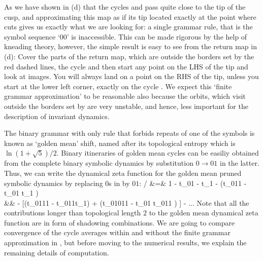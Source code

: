 As we have shown in  (d) that the cycles 
and  pass quite close to the tip of the cusp, and approximating this
map as if its tip located exactly at the point where  cuts gives us
exactly what we are looking for: a single grammar rule, that is the symbol
sequence `00' is inaccessible. This can be made rigorous by the help of
kneading theory, however, the simple result is easy to see from the return map
in  (d): Cover the parts of the return map, which
are outside the borders set by the red dashed lines, the cycle  and
then start any point on the LHS of the tip and look at images. You will always
land on a point on the RHS of the tip, unless you start at the lower left
corner, exactly on the cycle . We expect this `finite grammar
approximation' to be reasonable also because the orbits, which visit outside
the borders set by  are very unstable, and hence, less
important for the description of invariant dynamics.

The binary grammar with only rule that forbids repeats of one of the symbols is
known as `golden mean' shift, named after its topological entropy which is
$\ln (1 + \sqrt{5})/2$. Binary itineraries of golden mean cycles can be easiliy
obtained from the complete binary symbolic dynamics by substitution
$0 \rightarrow 01$ in  the latter. Thus, we can write the dynamical zeta
function for the golden mean pruned symbolic dynamics by replacing $0$s in
 by $01$:
 / \zeta &=& 1 - t_{01} - t_1 - (t_{011} - t_{01} t_1 )
              \label{e-GoldenMeanCycleExpansion}\\
		  && - [(t_{0111} - t_{011}t_1) + (t_{01011} - t_{01} t_{011} ) ] - ...
          \nonumber
\eea
Note that all the contributions longer than topological length $2$ to the
golden mean dynamical zeta function are in form of shadowing combinations. We
are going to compare convergence of the cycle averages within and without the
finite grammar approximation in , but before moving to
the numerical results, we explain the remaining details of computation.

